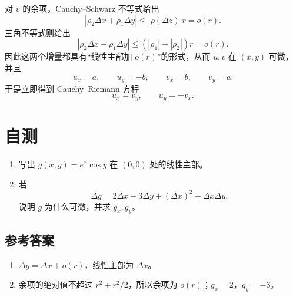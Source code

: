 \documentclass[UTF8,11pt]{ctexart}
\newcommand{\abs}[1]{\left\lvert#1\right\rvert}
\begin{document}
对 $v$ 的余项，Cauchy--Schwarz 不等式给出
\[
\abs{\rho_2\Delta x+\rho_1\Delta y}
\leq\abs{\rho(\Delta z)}r=o(r).
\]
三角不等式则给出
\[
\abs{\rho_2\Delta x+\rho_1\Delta y}
\leq(\abs{\rho_1}+\abs{\rho_2})r=o(r).
\]
因此这两个增量都具有“线性主部加 $o(r)$”的形式，从而 $u,v$
在 $(x,y)$ 可微，并且
\[
u_x=a,\qquad u_y=-b,\qquad
v_x=b,\qquad v_y=a.
\]
于是立即得到 Cauchy--Riemann 方程
\[
u_x=v_y,\qquad u_y=-v_x.
\]

\section{自测}

\begin{enumerate}
  \item 写出 $g(x,y)=e^x\cos y$ 在 $(0,0)$ 处的线性主部。
  \item 若
        \[
        \Delta g=2\Delta x-3\Delta y
        +(\Delta x)^2+\Delta x\Delta y,
        \]
        说明 $g$ 为什么可微，并求 $g_x,g_y$。
\end{enumerate}

\subsection*{参考答案}

\begin{enumerate}
  \item $\Delta g=\Delta x+o(r)$，线性主部为 $\Delta x$。
  \item 余项的绝对值不超过 $r^2+r^2/2$，所以余项为
        $o(r)$；$g_x=2$，$g_y=-3$。
\end{enumerate}
\end{document}
